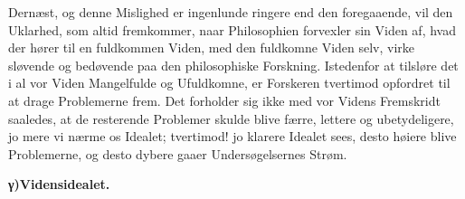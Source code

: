 \documentclass[12pt]{book}
\newcommand{\opage}[1]{\marginnote{\footnotesize\textit{[#1]}}}
\begin{document}
Dernæst, og denne Mislighed er ingenlunde ringere end den foregaaende, vil den Uklarhed, som altid
fremkommer, naar Philosophien forvexler sin Viden af, hvad
\opage{253} der hører til en fuldkommen Viden, med den fuldkomne Viden selv, virke sløvende og bedøvende paa den
philosophiske Forskning. Istedenfor at tilsløre det i al vor Viden Mangelfulde og Ufuldkomne, er
Forskeren tvertimod opfordret til at drage Problemerne frem. Det forholder sig ikke med vor Videns
Fremskridt saaledes, at de resterende Problemer skulde blive færre, lettere og ubetydeligere, jo
mere vi nærme os Idealet; tvertimod! jo klarere Idealet sees, desto høiere blive Problemerne, og
desto dybere gaaer Undersøgelsernes Strøm.

\begin{center}{\bfseries γ)\quad Vidensidealet.}\end{center}
\end{document}
